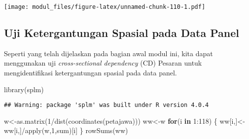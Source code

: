 \documentclass[
]{book}
\newenvironment{Shaded}{\begin{snugshade}}{\end{snugshade}}
\newcommand{\AttributeTok}[1]{\textcolor[rgb]{0.77,0.63,0.00}{#1}}
\newcommand{\ControlFlowTok}[1]{\textcolor[rgb]{0.13,0.29,0.53}{\textbf{#1}}}
\newcommand{\DecValTok}[1]{\textcolor[rgb]{0.00,0.00,0.81}{#1}}
\newcommand{\FunctionTok}[1]{\textcolor[rgb]{0.00,0.00,0.00}{#1}}
\newcommand{\NormalTok}[1]{#1}
\newcommand{\OtherTok}[1]{\textcolor[rgb]{0.56,0.35,0.01}{#1}}
\newcommand{\SpecialCharTok}[1]{\textcolor[rgb]{0.00,0.00,0.00}{#1}}
\newcommand{\StringTok}[1]{\textcolor[rgb]{0.31,0.60,0.02}{#1}}
\begin{document}
\begin{Shaded}
\end{Shaded}

\texttt{[image: modul\_files/figure-latex/unnamed-chunk-110-1.pdf]}

\hypertarget{uji-ketergantungan-spasial-pada-data-panel}{%
\subsection{Uji Ketergantungan Spasial pada Data Panel}\label{uji-ketergantungan-spasial-pada-data-panel}}

Seperti yang telah dijelaskan pada bagian awal modul ini, kita dapat menggunakan uji \emph{cross-sectional dependency} (CD) Pesaran untuk mengidentifikasi ketergantungan spasial pada data panel.

\begin{Shaded}
\begin{Highlighting}[]
\FunctionTok{library}\NormalTok{(splm)}
\end{Highlighting}
\end{Shaded}

\begin{verbatim}
## Warning: package 'splm' was built under R version 4.0.4
\end{verbatim}

\begin{Shaded}
\begin{Highlighting}[]
\NormalTok{w}\OtherTok{\textless{}{-}}\FunctionTok{as.matrix}\NormalTok{(}\DecValTok{1}\SpecialCharTok{/}\FunctionTok{dist}\NormalTok{(}\FunctionTok{coordinates}\NormalTok{(petajawa)))}
\NormalTok{ww}\OtherTok{\textless{}{-}}\NormalTok{w}
\ControlFlowTok{for}\NormalTok{(i }\ControlFlowTok{in} \DecValTok{1}\SpecialCharTok{:}\DecValTok{118}\NormalTok{)}
\NormalTok{\{}
\NormalTok{ww[i,]}\OtherTok{\textless{}{-}}\NormalTok{ww[i,]}\SpecialCharTok{/}\FunctionTok{apply}\NormalTok{(w,}\DecValTok{1}\NormalTok{,sum)[i]}
\NormalTok{\}}
\FunctionTok{rowSums}\NormalTok{(ww)}
\end{Highlighting}
\end{Shaded}
\end{document}
